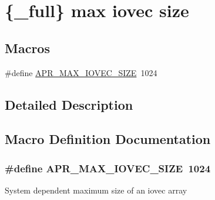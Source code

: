 \hypertarget{group__apr__file__writev}{}\section{\{\+\_\+full\} max iovec size}
\label{group__apr__file__writev}
\subsection*{Macros}
\begin{DoxyCompactItemize}
\item 
\#define \hyperlink{group__apr__file__writev_gae04a4721139b2b252ea20e68883da4b4}{A\+P\+R\+\_\+\+M\+A\+X\+\_\+\+I\+O\+V\+E\+C\+\_\+\+S\+I\+ZE}~1024
\end{DoxyCompactItemize}


\subsection{Detailed Description}


\subsection{Macro Definition Documentation}
\subsubsection[{\texorpdfstring{A\+P\+R\+\_\+\+M\+A\+X\+\_\+\+I\+O\+V\+E\+C\+\_\+\+S\+I\+ZE}{APR_MAX_IOVEC_SIZE}}]{\setlength{\rightskip}{0pt plus 5cm}\#define A\+P\+R\+\_\+\+M\+A\+X\+\_\+\+I\+O\+V\+E\+C\+\_\+\+S\+I\+ZE~1024}\hypertarget{group__apr__file__writev_gae04a4721139b2b252ea20e68883da4b4}{}\label{group__apr__file__writev_gae04a4721139b2b252ea20e68883da4b4}
System dependent maximum size of an iovec array 